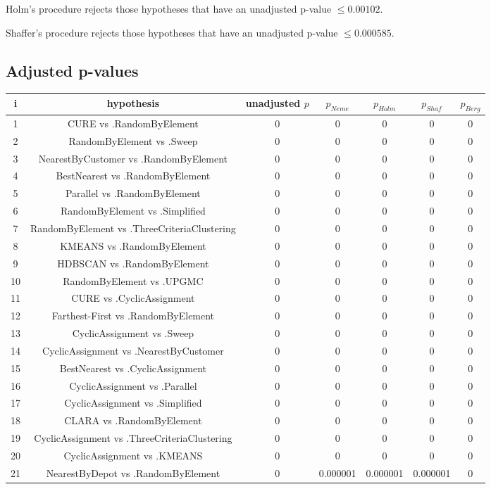 \documentclass[a4paper,10pt]{article}
\begin{document}
\begin{landscape}
Holm's procedure rejects those hypotheses that have an unadjusted p-value $\le0.00102$.

Shaffer's procedure rejects those hypotheses that have an unadjusted p-value $\le0.000585$.

\pagebreak

\subsection{Adjusted p-values}

\begin{table}[!htp]
\centering\scriptsize
\begin{tabular}{ccccccc}
i&hypothesis&unadjusted $p$&$p_{Neme}$&$p_{Holm}$&$p_{Shaf}$&$p_{Berg}$\\
\hline1&CURE vs .RandomByElement&0&0&0&0&0\\
2&RandomByElement vs .Sweep&0&0&0&0&0\\
3&NearestByCustomer vs .RandomByElement&0&0&0&0&0\\
4&BestNearest vs .RandomByElement&0&0&0&0&0\\
5&Parallel vs .RandomByElement&0&0&0&0&0\\
6&RandomByElement vs .Simplified&0&0&0&0&0\\
7&RandomByElement vs .ThreeCriteriaClustering&0&0&0&0&0\\
8&KMEANS vs .RandomByElement&0&0&0&0&0\\
9&HDBSCAN vs .RandomByElement&0&0&0&0&0\\
10&RandomByElement vs .UPGMC&0&0&0&0&0\\
11&CURE vs .CyclicAssignment&0&0&0&0&0\\
12&Farthest-First vs .RandomByElement&0&0&0&0&0\\
13&CyclicAssignment vs .Sweep&0&0&0&0&0\\
14&CyclicAssignment vs .NearestByCustomer&0&0&0&0&0\\
15&BestNearest vs .CyclicAssignment&0&0&0&0&0\\
16&CyclicAssignment vs .Parallel&0&0&0&0&0\\
17&CyclicAssignment vs .Simplified&0&0&0&0&0\\
18&CLARA vs .RandomByElement&0&0&0&0&0\\
19&CyclicAssignment vs .ThreeCriteriaClustering&0&0&0&0&0\\
20&CyclicAssignment vs .KMEANS&0&0&0&0&0\\
21&NearestByDepot vs .RandomByElement&0&0.000001&0.000001&0.000001&0\\

\end{tabular}
\end{table}
\end{landscape}
\end{document}
